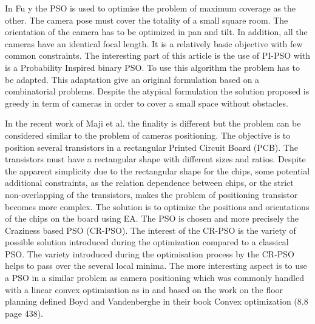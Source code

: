 In Fu y \cite{193*fu2014} the PSO is used to optimise the problem of maximum coverage as the other. 
 The camera pose must cover the totality of a small square room.
The orientation of the camera has to be optimized in pan and tilt. In addition, all the cameras have an identical focal length. It is a relatively basic objective with few common constraints. 
 The interesting part of this article \cite{193*fu2014} is the use of PI-PSO with is a Probability Inspired binary PSO. 
 To use this algorithm the problem has to be adapted. This adaptation give an original formulation based on a combinatorial problems. Despite the atypical formulation the solution proposed is greedy in term of cameras in order to cover a small space without obstacles. 
 
 In the recent work of Maji et al.\cite{143*maji2015} the finality is different but the problem can be considered similar to the problem of cameras positioning. 
The objective is to position several transistors in a rectangular Printed Circuit Board (PCB).
The transistors must have a rectangular shape with different sizes and ratios. 
  Despite the apparent simplicity due to the rectangular shape for the chips, some potential additional constraints, as the relation dependence between chips, or the strict non-overlapping of the transistors, makes the problem of positioning transistor becomes more complex. The solution is to optimize the positions and orientations of the chips on the board using EA. The  PSO is chosen and more precisely the Craziness based PSO (CR-PSO). The interest of the CR-PSO is the variety of possible solution introduced during the optimization compared to a classical PSO. The variety introduced during the optimisation process by the CR-PSO  helps to pass over the several local minima. 
  The more interesting aspect is to use a PSO in a similar problem as camera positioning which was commonly handled with a linear convex optimisation as in \citep{62*vijayan1991} and  based on the work on the floor planning defined Boyd and Vandenberghe in their book Convex optimization \cite{boyd2004convex}(8.8 page 438).  
  
